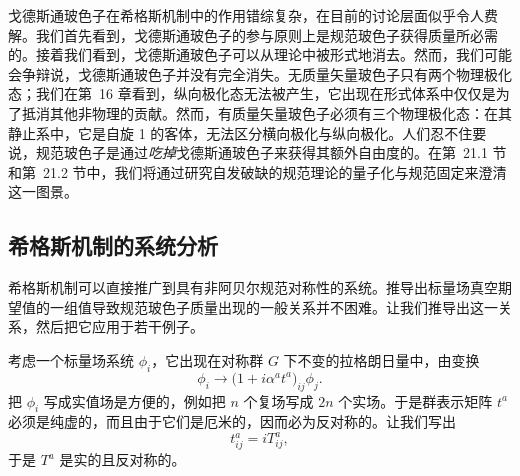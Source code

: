 戈德斯通玻色子在希格斯机制中的作用错综复杂，在目前的讨论层面似乎令人费解。我们首先看到，戈德斯通玻色子的参与原则上是规范玻色子获得质量所必需的。接着我们看到，戈德斯通玻色子可以从理论中被形式地消去。然而，我们可能会争辩说，戈德斯通玻色子并没有完全消失。无质量矢量玻色子只有两个物理极化态；我们在第~16 章看到，纵向极化态无法被产生，它出现在形式体系中仅仅是为了抵消其他非物理的贡献。然而，有质量矢量玻色子必须有三个物理极化态：在其静止系中，它是自旋 1 的客体，无法区分横向极化与纵向极化。人们忍不住要说，规范玻色子是通过\emph{吃掉}戈德斯通玻色子来获得其额外自由度的。在第~21.1 节和第~21.2 节中，我们将通过研究自发破缺的规范理论的量子化与规范固定来澄清这一图景。

\subsection{希格斯机制的系统分析}

希格斯机制可以直接推广到具有非阿贝尔规范对称性的系统。推导出标量场真空期望值的一组值导致规范玻色子质量出现的一般关系并不困难。让我们推导出这一关系，然后把它应用于若干例子。

考虑一个标量场系统 $\phi_i$，它出现在对称群 $G$ 下不变的拉格朗日量中，由变换
\begin{equation}
  \phi_i \to \bigl( 1 + i\alpha^a t^a \bigr)_{ij}\phi_j .
  \label{eq:20.13}
\end{equation}
把 $\phi_i$ 写成实值场是方便的，例如把 $n$ 个复场写成 $2n$ 个实场。于是群表示矩阵 $t^a$ 必须是纯虚的，而且由于它们是厄米的，因而必为反对称的。让我们写出
\begin{equation}
  t^a_{ij} = iT^a_{ij} ,
  \label{eq:20.14}
\end{equation}
于是 $T^a$ 是实的且反对称的。

